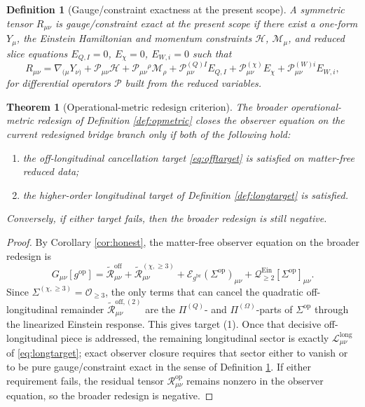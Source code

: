 \documentclass[11pt]{article}
\newcommand{\ReBridge}{g^{\mathrm{br}}}
\newcommand{\OpMetric}{g^{\mathrm{op}}}
\newcommand{\PiQ}{\Pi^{(Q)}}
\newcommand{\PiOmega}{\Pi^{(\Omega)}}
\newcommand{\SigmaOp}{\Sigma^{\mathrm{op}}}
\newcommand{\SigmaLong}{\Sigma^{(\chi,\ge 3)}}
\newcommand{\ReLong}{\widetilde{\mathcal R}_{\mu\nu}^{(\chi,\ge 3)}}
\newcommand{\ReOff}{\widetilde{\mathcal R}_{\mu\nu}^{\mathrm{off}}}
\newcommand{\ReOffTwo}{\widetilde{\mathcal R}_{\mu\nu}^{\mathrm{off},(2)}}
\newcommand{\EinLin}{\mathcal E_{\ReBridge}}
\newcommand{\EinQuad}{\mathcal Q_{\ge 2}^{\mathrm{Ein}}}
\newtheorem{definition}{Definition}
\newtheorem{theorem}{Theorem}
\begin{document}
\begin{definition}[Gauge/constraint exactness at the present scope]
\label{def:pure}
A symmetric tensor \(R_{\mu\nu}\) is \emph{gauge/constraint exact at the present scope} if there exist a one-form \(Y_\mu\), the Einstein Hamiltonian and momentum constraints \(\mathcal H\), \(\mathcal M_\mu\), and reduced slice equations \(E_{Q,I}=0\), \(E_\chi=0\), \(E_{W,i}=0\) such that
\begin{equation}
R_{\mu\nu}
=
\nabla_{(\mu}Y_{\nu)}
+\mathcal P_{\mu\nu}\mathcal H
+\mathcal P_{\mu\nu}{}^\rho\mathcal M_\rho
+\mathcal P_{\mu\nu}^{(Q)I}E_{Q,I}
+\mathcal P_{\mu\nu}^{(\chi)}E_\chi
+\mathcal P_{\mu\nu}^{(W)i}E_{W,i},
\label{eq:pure}
\end{equation}
for differential operators \(\mathcal P\) built from the reduced variables.
\end{definition}

\begin{theorem}[Operational-metric redesign criterion]
\label{thm:criterion}
The broader operational-metric redesign of Definition \ref{def:opmetric} closes the observer equation on the current redesigned bridge branch only if both of the following hold:
\begin{enumerate}
    \item the off-longitudinal cancellation target \eqref{eq:offtarget} is satisfied on matter-free reduced data;
    \item the higher-order longitudinal target of Definition \ref{def:longtarget} is satisfied.
\end{enumerate}
Conversely, if either target fails, then the broader redesign is still negative.
\end{theorem}

\begin{proof}
By Corollary \ref{cor:honest}, the matter-free observer equation on the broader redesign is
\[
G_{\mu\nu}[\OpMetric]
=
\ReOff+\ReLong
+\EinLin(\SigmaOp)_{\mu\nu}
+\EinQuad[\SigmaOp]_{\mu\nu}.
\]
Since \(\SigmaLong=\mathcal O_{\ge 3}\), the only terms that can cancel the quadratic off-longitudinal remainder \(\ReOffTwo\) are the \(\PiQ\)- and \(\PiOmega\)-parts of \(\SigmaOp\) through the linearized Einstein response. This gives target (1). Once that decisive off-longitudinal piece is addressed, the remaining longitudinal sector is exactly \(\mathcal L_{\mu\nu}^{\mathrm{long}}\) of \eqref{eq:longtarget}; exact observer closure requires that sector either to vanish or to be pure gauge/constraint exact in the sense of Definition \ref{def:pure}. If either requirement fails, the residual tensor \(\mathcal R_{\mu\nu}^{\mathrm{op}}\) remains nonzero in the observer equation, so the broader redesign is negative.
\end{proof}
\end{document}
